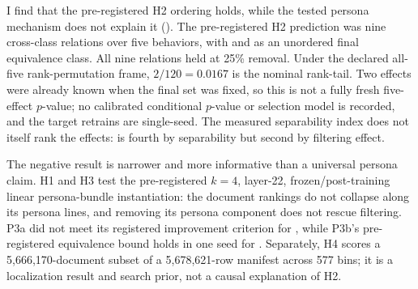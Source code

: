 I find that the pre-registered H2 ordering holds, while the tested persona
mechanism does not explain it (). The
pre-registered H2 prediction was nine cross-class relations over five
behaviors, with  and 
as an unordered final equivalence class. All nine relations held at 25\%
removal. Under the declared all-five rank-permutation frame, $2/120 = 0.0167$
is the nominal rank-tail. Two effects were already known when the final set
was fixed, so this is not a fully fresh five-effect $p$-value; no calibrated
conditional $p$-value or selection model is recorded, and the target retrains
are single-seed. The measured separability index does not itself rank the
effects:
 is fourth by separability but second by
filtering effect.

The negative result is narrower and more informative than a universal
persona claim. H1 and H3 test the pre-registered $k=4$, layer-22,
frozen/post-training linear persona-bundle instantiation: the document
rankings do not collapse along its persona lines, and removing its persona
component does not rescue filtering. P3a did not meet its registered
improvement criterion for , while P3b's
pre-registered equivalence bound holds in one seed for
. Separately, H4 scores a 5,666,170-document subset of a
5,678,621-row manifest across 577 bins; it is a localization result and
search prior, not a causal explanation of H2.
